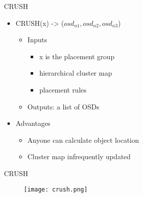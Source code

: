 \begin{frame}{CRUSH}
    \begin{itemize}
        \item CRUSH(x) -> ($osd_{n1}, osd_{n2}, osd_{n3}$)
            \begin{itemize}
                \item Inputs
                    \begin{itemize}
                        \item x is the placement group
                        \item hierarchical cluster map
                        \item placement rules
                    \end{itemize}
                \item Outputs: a list of OSDs
            \end{itemize}
        \item Advantages
            \begin{itemize}
                \item Anyone can calculate object location
                \item Cluster map infrequently updated
            \end{itemize}
    \end{itemize}
\end{frame}

\begin{frame}{CRUSH}
    \begin{figure}[htpb]
        \centering
        \texttt{[image: crush.png]}
    \end{figure}
\end{frame}

